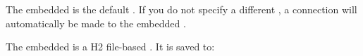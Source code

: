 The embedded \gddb{} is the default \gddb{}. If you do not specify a different \gddb{}, a connection will automatically be made to the embedded \gddb{}. 

The embedded \gddb{} is a H2 file-based \gddb{}. It is saved to: \\


